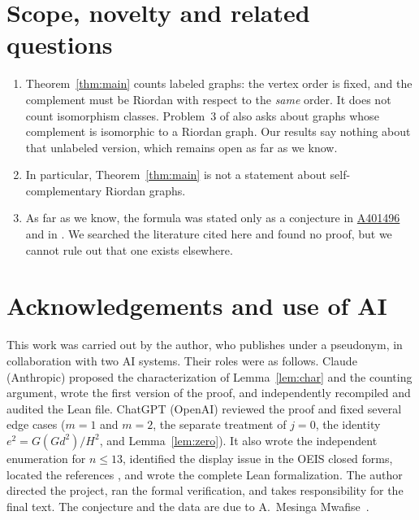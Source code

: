 \documentclass[11pt,a4paper]{amsart}
\theoremstyle{definition}
\theoremstyle{remark}
\newcommand{\oeis}[1]{\href{https://oeis.org/#1}{#1}}
\begin{document}
\section{Scope, novelty and related questions}\label{sec:scope}

\begin{enumerate}[leftmargin=2em]
\item Theorem~\ref{thm:main} counts labeled graphs: the vertex order is fixed, and the complement must be Riordan with respect to the \emph{same} order. It does not count isomorphism classes. Problem~3 of \cite{CJKM} also asks about graphs whose complement is isomorphic to a Riordan graph. Our results say nothing about that unlabeled version, which remains open as far as we know.
\item In particular, Theorem~\ref{thm:main} is not a statement about self-complementary Riordan graphs.
\item As far as we know, the formula was stated only as a conjecture in \oeis{A401496} and in \cite{MMsoft}. We searched the literature cited here and found no proof, but we cannot rule out that one exists elsewhere.
\end{enumerate}

\section*{Acknowledgements and use of AI}

This work was carried out by the author, who publishes under a pseudonym, in collaboration with two AI systems. Their roles were as follows. Claude (Anthropic) proposed the characterization of Lemma~\ref{lem:char} and the counting argument, wrote the first version of the proof, and independently recompiled and audited the Lean file. ChatGPT (OpenAI) reviewed the proof and fixed several edge cases ($m=1$ and $m=2$, the separate treatment of $j=0$, the identity $e^2=G(Gd^2)/H^2$, and Lemma~\ref{lem:zero}). It also wrote the independent enumeration for $n\le 13$, identified the display issue in the OEIS closed forms, located the references \cite{CJKM,BvBCDDPS}, and wrote the complete Lean formalization. The author directed the project, ran the formal verification, and takes responsibility for the final text. The conjecture and the data are due to A.~Mesinga Mwafise~\cite{MMsoft}.
\end{document}
